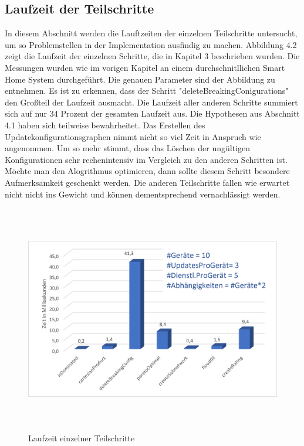 \subsection{Laufzeit der Teilschritte}
In diesem Abschnitt werden die Lauftzeiten der einzelnen Teilschritte untersucht, um so Problemstellen in der Implementation ausfindig zu machen. Abbildung 4.2 zeigt die
Laufzeit der einzelnen Schritte, die in Kapitel 3 beschrieben wurden. Die Messungen wurden wie im vorigen Kapitel an einem durchschnitllichen Smart Home System durchgeführt.
Die genauen Parameter sind der Abbildung zu entnehmen.
Es ist zu erkennen, dass der Schritt "deleteBreakingConigurations" den Großteil der Laufzeit ausmacht. Die Laufzeit aller anderen Schritte summiert sich auf nur 34 Prozent
der gesamten Laufzeit aus. Die Hypothesen aus Abschnitt 4.1 haben sich teilweise bewahrheitet. Das Erstellen des Updatekonfigurationsgraphen nimmt nicht so viel Zeit
in Anspruch wie angenommen.
Um so mehr stimmt, dass das Löschen der ungültigen Konfigurationen sehr rechenintensiv im Vergleich zu den anderen Schritten ist. Möchte man den Alogrithmus optimieren,
dann sollte diesem Schritt besondere Aufmerksamkeit geschenkt werden. Die anderen Teilschritte fallen wie erwartet nicht nicht ins Gewicht und können dementsprechend vernachlässigt
werden.
\begin{figure}[h]
\begin{center}
\includegraphics[width=14cm,height=10cm]{"Teilschritte"}
\caption{Laufzeit einzelner Teilschritte}
\label{fig:Prob1:MEA}
\end{center}
\end{figure}

